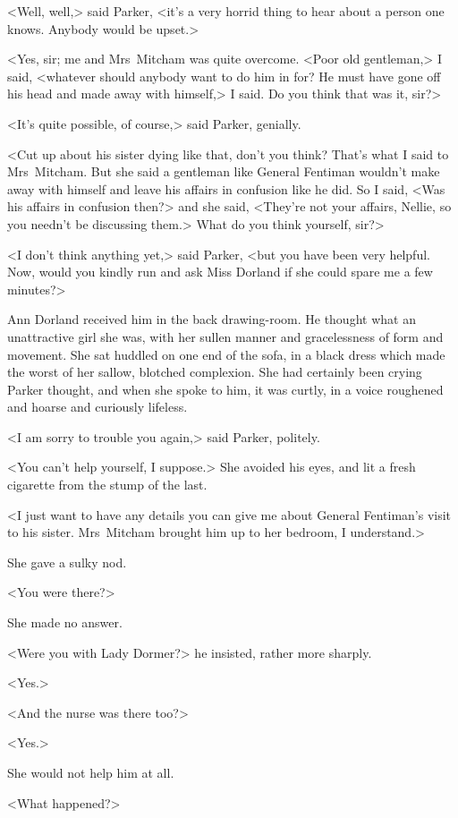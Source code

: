 <Well, well,> said Parker, <it's a very horrid thing to hear about a person one knows. Anybody would be upset.>

<Yes, sir; me and Mrs~Mitcham was quite overcome. <Poor old gentleman,> I said, <whatever should anybody want to do him in for? He must have gone off his head and made away with himself,> I said. Do you think that was it, sir?>

<It's quite possible, of course,> said Parker, genially.

<Cut up about his sister dying like that, don't you think? That's what I said to Mrs~Mitcham. But she said a gentleman like General Fentiman wouldn't make away with himself and leave his affairs in confusion like he did. So I said, <Was his affairs in confusion then?> and she said, <They're not your affairs, Nellie, so you needn't be discussing them.> What do you think yourself, sir?>

<I don't think anything yet,> said Parker, <but you have been very helpful. Now, would you kindly run and ask Miss Dorland if she could spare me a few minutes?>

Ann Dorland received him in the back drawing-room. He thought what an unattractive girl she was, with her sullen manner and gracelessness of form and movement. She sat huddled on one end of the sofa, in a black dress which made the worst of her sallow, blotched complexion. She had certainly been crying Parker thought, and when she spoke to him, it was curtly, in a voice roughened and hoarse and curiously lifeless.

<I am sorry to trouble you again,> said Parker, politely.

<You can't help yourself, I suppose.> She avoided his eyes, and lit a fresh cigarette from the stump of the last.

<I just want to have any details you can give me about General Fentiman's visit to his sister. Mrs~Mitcham brought him up to her bedroom, I understand.>

She gave a sulky nod.

<You were there?>

She made no answer.

<Were you with Lady Dormer?> he insisted, rather more sharply.

<Yes.>

<And the nurse was there too?>

<Yes.>

She would not help him at all.

<What happened?>

